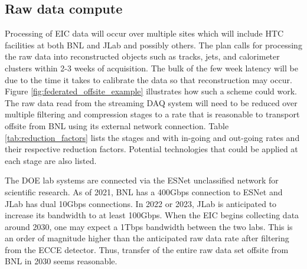 \subsection{Raw data compute}
Processing of EIC data will occur over multiple sites which will include HTC facilities at both BNL and JLab and possibly others. The plan calls for processing the raw data into reconstructed objects such as tracks, jets, and calorimeter clusters within 2-3 weeks of acquisition. The bulk of the few week latency will be due to the time it takes to calibrate the data so that reconstruction may occur. Figure \ref{fig:federated_offsite_example} illustrates how such a scheme could work. The raw data read from the streaming DAQ system will need to be reduced over multiple filtering and compression stages to a rate that is reasonable to transport offsite from BNL using its external network connection. Table \ref{tab:reduction_factors} lists the stages and with in-going and out-going rates and their respective reduction factors. Potential technologies that could be applied at each stage are also listed.

The DOE lab systems are connected via the ESNet unclassified network for scientific research\cite{ESNet}. As of 2021, BNL has a 400Gbps connection to ESNet and JLab has dual 10Gbps connections. In 2022 or 2023, JLab is anticipated to increase its bandwidth to at least 100Gbps. When the EIC begins collecting data around 2030, one may expect a 1Tbps bandwidth between the two labs. This is an order of magnitude higher than the anticipated raw data rate after filtering from the ECCE detector. Thus, transfer of the entire raw data set offsite from BNL in 2030 seems reasonable.


